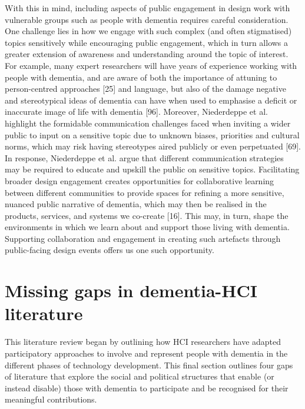With this in mind, including aspects of public engagement in design work with vulnerable groups such as people with dementia requires careful consideration. One challenge lies in how we engage with such complex (and often stigmatised) topics sensitively while encouraging public engagement, which in turn allows a greater extension of awareness and understanding around the topic of interest. For example, many expert researchers will have years of experience working with people with dementia, and are aware of both the importance of attuning to person-centred approaches [25] and language, but also of the damage negative and stereotypical ideas of dementia can have when used to emphasise a deficit or inaccurate image of life with dementia [96]. Moreover, Niederdeppe et al. highlight the formidable communication challenges faced when inviting a wider public to input on a sensitive topic due to unknown biases, priorities and cultural norms, which may risk having stereotypes aired publicly or even perpetuated [69]. In response, Niederdeppe et al. argue that different communication strategies may be required to educate and upskill the public on sensitive topics.
 Facilitating broader design engagement creates opportunities for collaborative learning between different communities to provide spaces for refining a more sensitive, nuanced public narrative of dementia, which may then be realised in the products, services, and systems we co-create [16]. This may, in turn, shape the environments in which we learn about and support those living with dementia. Supporting collaboration and engagement in creating such artefacts through public-facing design events offers us one such opportunity. 

\section{Missing gaps in dementia-HCI literature}
\label{BL:Missing-gaps}
This literature review began by outlining how HCI researchers have adapted participatory approaches to involve and represent people with dementia in the different phases of technology development. This final section outlines four gaps of literature that explore the social and political structures that enable (or instead disable) those with dementia to participate and be recognised for their meaningful contributions. 


